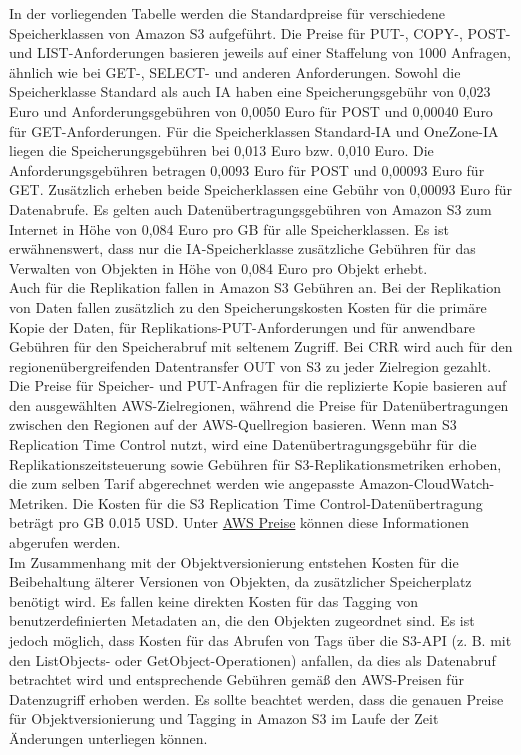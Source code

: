 In der vorliegenden Tabelle werden die Standardpreise für verschiedene Speicherklassen von Amazon S3 aufgeführt. Die Preise für PUT-, COPY-, POST- und LIST-Anforderungen basieren jeweils auf einer Staffelung von 1000 Anfragen, ähnlich wie bei GET-, SELECT- und anderen Anforderungen. Sowohl die Speicherklasse Standard als auch IA haben eine Speicherungsgebühr von 0,023 Euro und Anforderungsgebühren von 0,0050 Euro für POST und 0,00040 Euro für GET-Anforderungen. Für die Speicherklassen Standard-IA und OneZone-IA liegen die Speicherungsgebühren bei 0,013 Euro bzw. 0,010 Euro. Die Anforderungsgebühren betragen 0,0093 Euro für POST und 0,00093 Euro für GET. Zusätzlich erheben beide Speicherklassen eine Gebühr von 0,00093 Euro für Datenabrufe. Es gelten auch Datenübertragungsgebühren von Amazon S3 zum Internet in Höhe von 0,084 Euro pro GB für alle Speicherklassen. Es ist erwähnenswert, dass nur die IA-Speicherklasse zusätzliche Gebühren für das Verwalten von Objekten in Höhe von 0,084 Euro pro Objekt erhebt.\\

Auch für die Replikation fallen in Amazon S3 Gebühren an. Bei der Replikation von Daten fallen zusätzlich zu den Speicherungskosten Kosten für die primäre Kopie der Daten, für Replikations-PUT-Anforderungen und für anwendbare Gebühren für den Speicherabruf mit seltenem Zugriff. Bei CRR wird auch für den regionenübergreifenden Datentransfer OUT von S3 zu jeder Zielregion gezahlt. Die Preise für Speicher- und PUT-Anfragen für die replizierte Kopie basieren auf den ausgewählten AWS-Zielregionen, während die Preise für Datenübertragungen zwischen den Regionen auf der AWS-Quellregion basieren. Wenn man S3 Replication Time Control nutzt, wird eine Datenübertragungsgebühr für die Replikationszeitsteuerung sowie Gebühren für S3-Replikationsmetriken erhoben, die zum selben Tarif abgerechnet werden wie angepasste Amazon-CloudWatch-Metriken. Die Kosten für die S3 Replication Time Control-Datenübertragung beträgt pro GB 0.015 USD. Unter \href{https://aws.amazon.com/de/s3/pricing/}{AWS Preise} können diese Informationen abgerufen werden.\\

Im Zusammenhang mit der Objektversionierung entstehen Kosten für die Beibehaltung älterer Versionen von Objekten, da zusätzlicher Speicherplatz benötigt wird. Es fallen keine direkten Kosten für das Tagging von benutzerdefinierten Metadaten an, die den Objekten zugeordnet sind. Es ist jedoch möglich, dass Kosten für das Abrufen von Tags über die S3-API (z. B. mit den ListObjects- oder GetObject-Operationen) anfallen, da dies als Datenabruf betrachtet wird und entsprechende Gebühren gemäß den AWS-Preisen für Datenzugriff erhoben werden. Es sollte beachtet werden, dass die genauen Preise für Objektversionierung und Tagging in Amazon S3 im Laufe der Zeit Änderungen unterliegen können.\\

